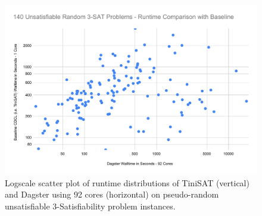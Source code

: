 \begin{figure}
  \centering
  \includegraphics[width=.8\columnwidth]{./figs/3UNSAT_140random.pdf}
  \caption{Logscale scatter plot of runtime distributions of \mbox{TiniSAT} (vertical) and  \mbox{Dagster} using 92 cores (horizontal) on pseudo-random unsatisfiable $3$-Satisfiability problem instances.\label{fig:3UNSAT_140random}}
\end{figure}
